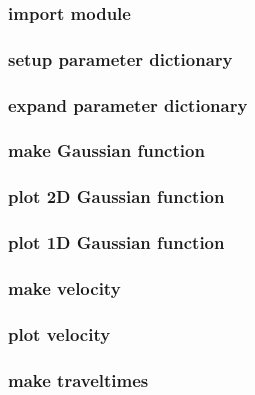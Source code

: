 

\begin{frame} \frametitle{import module}
\end{frame}
\cwpnote{}

\begin{frame} \frametitle{setup parameter dictionary}
\end{frame}
\cwpnote{}

\begin{frame} \frametitle{expand parameter dictionary}
\end{frame}
\cwpnote{}


\begin{frame} \frametitle{make Gaussian function}
\end{frame}
\cwpnote{}

\begin{frame} \frametitle{plot 2D Gaussian function}
\end{frame}
\cwpnote{}

\begin{frame}
\end{frame}
\cwpnote{}

\begin{frame} \frametitle{plot 1D Gaussian function}
\end{frame}
\cwpnote{}

\begin{frame}
\end{frame}
\cwpnote{}


\begin{frame} \frametitle{make velocity}
\end{frame}
\cwpnote{}

\begin{frame} \frametitle{plot velocity}
\end{frame}
\cwpnote{}


\begin{frame} \frametitle{make traveltimes}
\end{frame}
\cwpnote{}

